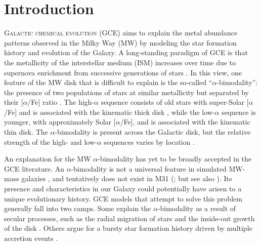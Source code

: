 \documentclass[twocolumn,twocolappendix,linenumbers]{aastex631}
\newcommand{\todo}[1]{{\color{red}#1}}
\newcommand{\aFe}{[$\alpha$/Fe]\xspace}
\begin{document}
\section{Introduction}
\label{sec:introduction}

\lettrine{G}{alactic chemical evolution} (GCE) aims to explain the metal abundance patterns observed in the Milky Way (MW) by modeling the star formation history and evolution of the Galaxy. A long-standing paradigm of GCE is that the metallicity of the interstellar medium (ISM) increases over time due to supernova enrichment from successive generations of stars \citep[e.g.,][]{tinsley_stellar_1979,matteucci_relative_1986}. In this view, one feature of the MW disk that is difficult to explain is the so-called ``$\alpha$-bimodality'': the presence of two populations of stars at similar metallicity but separated by their \aFe ratio \citep[e.g.,][]{bensby_exploring_2014}. The high-$\alpha$ sequence consists of old stars \citep[$\gtrsim9$ Gyr; e.g.,][]{pinsonneault_apokasc-3_2025} with super-Solar \aFe and is associated with the kinematic thick disk \citep[e.g.,][]{fuhrmann_nearby_1998}, while the low-$\alpha$ sequence is younger, with approximately Solar \aFe, and is associated with the kinematic thin disk. The $\alpha$-bimodality is present across the Galactic disk, but the relative strength of the high- and low-$\alpha$ sequences varies by location \citep{hayden_chemical_2015}. 

An explanation for the MW $\alpha$-bimodality has yet to be broadly accepted in the GCE literature. An $\alpha$-bimodality is not a universal feature in simulated MW-mass galaxies \citep[e.g.,][]{mackereth_origin_2018,parul_effect_2025}, and tentatively does not exist in M31 (\citealt{nidever_prevalence_2024}; but see also \citealt{kobayashi_fe_2023}). Its presence and characteristics in our Galaxy could potentially have arisen to a unique evolutionary history. GCE models that attempt to solve this problem generally fall into two camps. Some explain the $\alpha$-bimodality as a result of secular processes, such as the radial migration of stars and the inside-out growth of the disk \citep[e.g.,][]{schonrich_chemical_2009,kubryk_evolution_2015,sharma_chemical_2021,chen_chemical_2023,prantzos_origin_2023}. Others argue for a bursty star formation history driven by multiple accretion events \citep[e.g.,][]{chiappini_chemical_1997,mackereth_origin_2018,spitoni_beyond_2023}.
\end{document}
